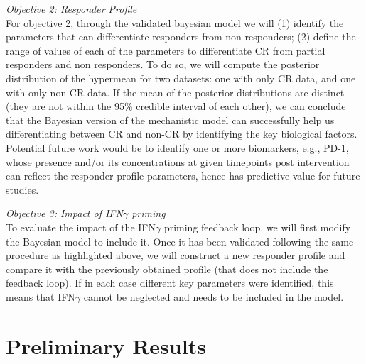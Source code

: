 \documentclass[11pt]{article}
\begin{document}

\textit{Objective 2: Responder Profile}\\[3pt]
For objective 2, through the validated bayesian model we will (1) identify the parameters that can differentiate responders from non-responders; (2) define the range of values of each of the parameters to differentiate CR from partial responders and non responders. To do so, we will compute the posterior distribution of the hypermean for two datasets: one with only CR data, and one with only non-CR data. If the mean of the posterior distributions are distinct (they are not within the 95\% credible interval of each other), we can conclude that the Bayesian version of the mechanistic model can successfully help us differentiating between CR and non-CR by identifying the key biological factors. Potential future work would be to identify one or more biomarkers, e.g., PD-1, whose presence and/or its concentrations at given timepoints post intervention can reflect the responder profile parameters, hence has predictive value for future studies.

\textit{Objective 3: Impact of IFN$\gamma$ priming}\\[3pt]
To evaluate the impact of the IFN$\gamma$ priming feedback loop, we will first modify the Bayesian model to include it. Once it has been validated following the same procedure as highlighted above, we will construct a new responder profile and compare it with the previously obtained profile (that does not include the feedback loop). If in each case different key parameters were identified, this means that IFN$\gamma$ cannot be neglected and needs to be included in the model.

\section{Preliminary Results}
\end{document}
